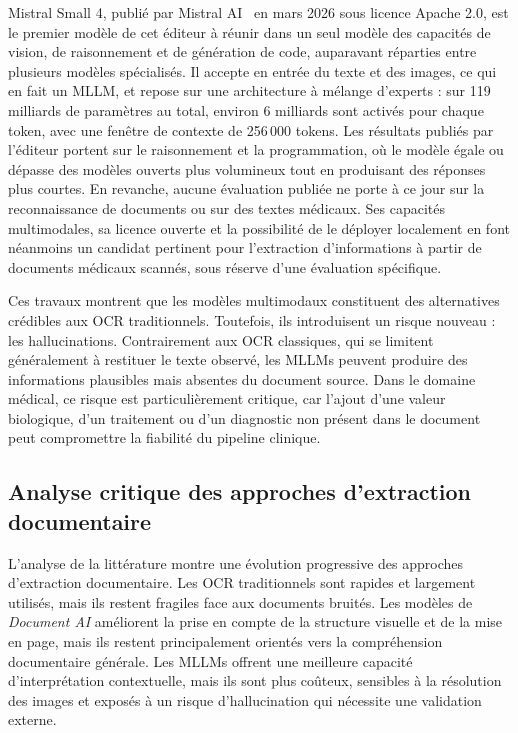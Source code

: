 Mistral Small 4, publié par Mistral AI~\cite{mistralsmall4} en mars 2026 sous licence Apache 2.0, est le premier modèle de cet éditeur à réunir dans un seul modèle des capacités de vision, de raisonnement et de génération de code, auparavant réparties entre plusieurs modèles spécialisés. Il accepte en entrée du texte et des images, ce qui en fait un MLLM, et repose sur une architecture à mélange d'experts : sur 119 milliards de paramètres au total, environ 6 milliards sont activés pour chaque token, avec une fenêtre de contexte de 256\,000 tokens. Les résultats publiés par l'éditeur portent sur le raisonnement et la programmation, où le modèle égale ou dépasse des modèles ouverts plus volumineux tout en produisant des réponses plus courtes. En revanche, aucune évaluation publiée ne porte à ce jour sur la reconnaissance de documents ou sur des textes médicaux. Ses capacités multimodales, sa licence ouverte et la possibilité de le déployer localement en font néanmoins un candidat pertinent pour l'extraction d'informations à partir de documents médicaux scannés, sous réserve d'une évaluation spécifique.

Ces travaux montrent que les modèles multimodaux constituent des alternatives crédibles aux OCR traditionnels. Toutefois, ils introduisent un risque nouveau : les hallucinations. Contrairement aux OCR classiques, qui se limitent généralement à restituer le texte observé, les MLLMs peuvent produire des informations plausibles mais absentes du document source. Dans le domaine médical, ce risque est particulièrement critique, car l'ajout d'une valeur biologique, d'un traitement ou d'un diagnostic non présent dans le document peut compromettre la fiabilité du pipeline clinique.

\subsection{Analyse critique des approches d'extraction documentaire}

L'analyse de la littérature montre une évolution progressive des approches d'extraction documentaire. Les OCR traditionnels sont rapides et largement utilisés, mais ils restent fragiles face aux documents bruités. Les modèles de \textit{Document AI} améliorent la prise en compte de la structure visuelle et de la mise en page, mais ils restent principalement orientés vers la compréhension documentaire générale. Les MLLMs offrent une meilleure capacité d'interprétation contextuelle, mais ils sont plus coûteux, sensibles à la résolution des images et exposés à un risque d'hallucination qui nécessite une validation externe.

